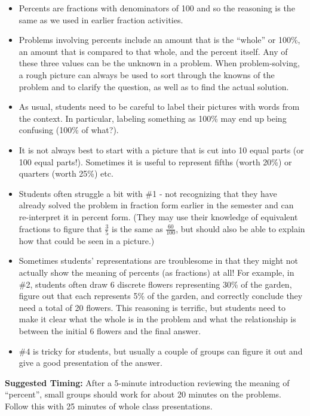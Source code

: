 \documentclass[nooutcomes,noauthor,handout]{ximera}
\begin{document}
\begin{instructorNotes}
\begin{itemize}
	\item Percents are fractions with denominators of 100 and so the reasoning is the same as we used in earlier fraction activities.
	\item Problems involving percents include an amount that is the ``whole'' or 100\%, an amount that is compared to that whole, and the percent itself.  Any of these three values can be the unknown in a problem.  When problem-solving, a rough picture can always be used to sort through the knowns of the problem and to clarify the question, as well as to find the actual solution.
	\item  As usual, students need to be careful to label their pictures with words from the context.  In particular, labeling something as 100\% may end up being confusing (100\% of what?).
	\item It is not always best to start with a picture that is cut into 10 equal parts (or 100 equal parts!).   Sometimes it is useful to represent fifths (worth 20\%) or quarters (worth 25\%) etc.
	\item Students often struggle a bit with \#1 - not recognizing that they have already solved the problem in fraction form earlier in the semester and can re-interpret it in percent form.  (They may use their knowledge of equivalent fractions to figure that $\frac35$ is the same as $\frac{60}{100}$, but should also be able to explain how that could be seen in a picture.)  
	\item Sometimes students' representations are troublesome in that they might not actually show the meaning of percents (as fractions) at all!  For example, in \#2, students often draw 6 discrete flowers representing 30\% of the garden, figure out that each represents 5\% of the garden, and correctly conclude they need a total of 20 flowers.  This reasoning is terrific, but students need to make it clear what the whole is in the problem and what the relationship is between the initial 6 flowers and the final answer. 
	\item \#4 is tricky for students, but usually a couple of groups can figure it out and give a good presentation of the answer.
\end{itemize}



{\bf Suggested Timing:} After a 5-minute introduction reviewing the meaning of ``percent'', small groups should work for about 20 minutes on the problems.  Follow this with 25 minutes of whole class presentations.  
\end{instructorNotes}
\end{document}

